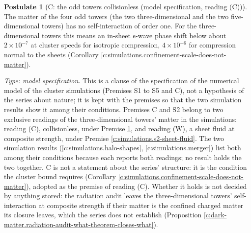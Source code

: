\documentclass[11pt]{article}
\theoremstyle{definition}
\newtheorem{postulate}[theorem]{Postulate}
\theoremstyle{plain}
\newcommand{\changedmark}[2]{\marginpar{\raggedright\scriptsize\color{#1}#2}}
\begin{document}
\begin{postulate}[C: the odd towers collisionless (model specification, reading (C))]\label{c:simulations.c-odd-towers-collisionless}
\changedmark{BurntOrange}{changed since the deposit}
The matter of the four odd towers (the two three-dimensional and the two five-dimensional towers) has no self-interaction of order one. For the three-dimensional towers this means an in-sheet s-wave phase shift below about $2 \times 10^{-7}$ at cluster speeds for isotropic compression, $4 \times 10^{-6}$ for compression normal to the sheets (Corollary \ref{c:simulations.confinement-scale-does-not-matter}).

\emph{Type: model specification.} This is a clause of the specification of the numerical model of the cluster simulations (Premises S1 to S5 and C), not a hypothesis of the series about nature; it is kept with the premises so that the two simulation results show it among their conditions. Premises C and S2 belong to two exclusive readings of the three-dimensional towers' matter in the simulations: reading (C), collisionless, under Premise \ref{c:simulations.c-odd-towers-collisionless}, and reading (W), a sheet fluid at composite strength, under Premise \ref{c:simulations.s2-sheet-fluid}. The two simulation results (\ref{c:simulations.halo-shapes}, \ref{c:simulations.merger}) list both among their conditions because each reports both readings; no result holds the two together. C is not a statement about the series' structure: it is the condition the cluster bound requires (Corollary \ref{c:simulations.confinement-scale-does-not-matter}), adopted as the premise of reading (C). Whether it holds is not decided by anything stored: the radiation audit leaves the three-dimensional towers' self-interaction at composite strength if their matter is the confined charged matter its closure leaves, which the series does not establish (Proposition \ref{c:dark-matter.radiation-audit-what-theorem-closes-what}).
\end{postulate}
\end{document}
